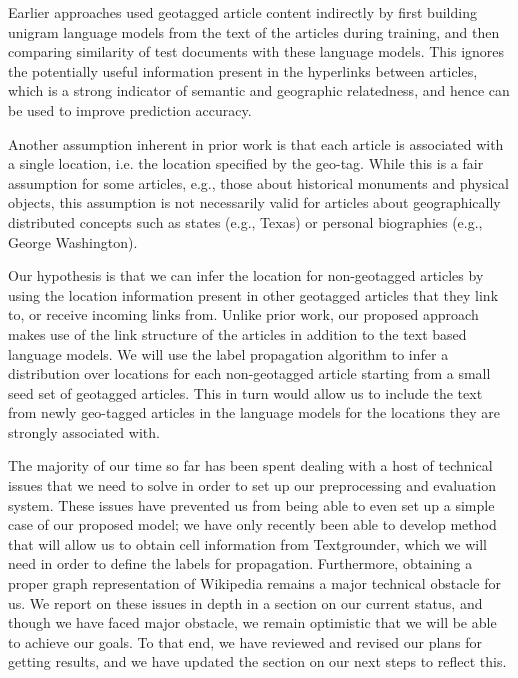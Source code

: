 Earlier approaches used geotagged article content indirectly by first building
unigram language models from the text of the articles during training, and then
comparing similarity of test documents with these language models.
This ignores the potentially useful information present in the  hyperlinks
between articles, which is a strong indicator of semantic and geographic
relatedness, and hence can be used to improve prediction accuracy.

Another assumption inherent in prior work is that each article is associated
with a single location, i.e. the location specified by the geo-tag.
While this is a fair assumption for some articles, e.g., those about historical
monuments and physical objects, this assumption is not necessarily valid for
articles about geographically distributed concepts such as states (e.g., Texas)
or personal biographies (e.g., George Washington). 

Our hypothesis is that we can infer the location for non-geotagged articles by
using the location information present in other geotagged articles that they
link to, or receive incoming links from.
Unlike prior work, our proposed approach makes use of the link structure of the
articles in addition to the text based language models.
We will use the label propagation algorithm to infer a distribution over
locations for each non-geotagged article starting from a small seed set of
geotagged articles.
This in turn would allow us to include the text from newly geo-tagged articles
in the language models for the locations they are strongly associated with.

The majority of our time so far has been spent dealing with a host of
technical issues that we need to solve in order to set up our preprocessing and
evaluation system.
These issues have prevented us from being able to even set up a simple case of
our proposed model; we have only recently been able to develop method that will
allow us to obtain cell information from Textgrounder, which we will need in
order to define the labels for propagation.
Furthermore, obtaining a proper graph representation of Wikipedia remains a
major technical obstacle for us.
We report on these issues in depth in a section on our current status, and
though we have faced major obstacle, we remain optimistic that we will be able
to achieve our goals.
To that end, we have reviewed and revised our plans for getting results, and we
have updated the section on our next steps to reflect this.


